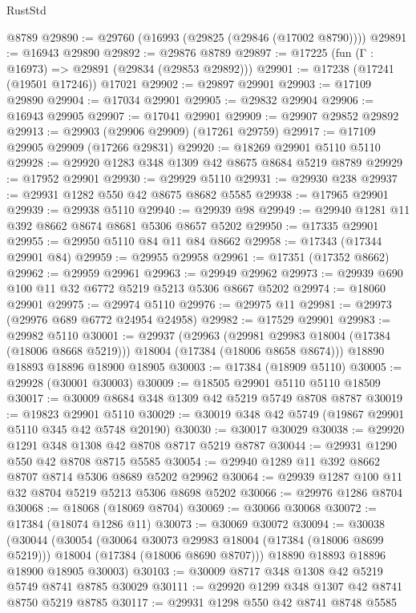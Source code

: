 \begin{lexlean}{RustStd}
\begin{coremodule}
    @8789
@29890 := @29760 (@16993 (@29825 (@29846 (@17002 @8790))))
@29891 := @16943 @29890
@29892 := @29876 @8789
@29897 := @17225 (fun (Γ : @16973) => @29891 (@29834 (@29853 @29892)))
@29901 := @17238 (@17241 (@19501 @17246)) @17021
@29902 := @29897 @29901
@29903 := @17109 @29890
@29904 := @17034 @29901
@29905 := @29832 @29904
@29906 := @16943 @29905
@29907 := @17041 @29901
@29909 := @29907 @29852 @29892
@29913 := @29903 (@29906 @29909) (@17261 @29759)
@29917 := @17109 @29905 @29909 (@17266 @29831)
@29920 := @18269 @29901 @5110 @5110
@29928 := @29920 @1283 @348 @1309 @42 @8675 @8684 @5219 @8789
@29929 := @17952 @29901
@29930 := @29929 @5110
@29931 := @29930 @238
@29937 := @29931 @1282 @550 @42 @8675 @8682 @5585
@29938 := @17965 @29901
@29939 := @29938 @5110
@29940 := @29939 @98
@29949 := @29940 @1281 @11 @392 @8662 @8674 @8681 @5306 @8657 @5202
@29950 := @17335 @29901
@29955 := @29950 @5110 @84 @11 @84 @8662
@29958 := @17343 (@17344 @29901 @84)
@29959 := @29955 @29958
@29961 := @17351 (@17352 @8662)
@29962 := @29959 @29961
@29963 := @29949 @29962
@29973 := @29939 @690 @100 @11 @32 @6772 @5219 @5213 @5306 @8667 @5202
@29974 := @18060 @29901
@29975 := @29974 @5110
@29976 := @29975 @11
@29981 := @29973 (@29976 @689 @6772 @24954 @24958)
@29982 := @17529 @29901
@29983 := @29982 @5110
@30001 := @29937
    (@29963
      (@29981 @29983 @18004 (@17384 (@18006 @8668 @5219)))
      @18004
      (@17384 (@18006 @8658 @8674)))
    @18890
    @18893
    @18896
    @18900
    @18905
@30003 := @17384 (@18909 @5110)
@30005 := @29928 (@30001 @30003)
@30009 := @18505 @29901 @5110 @5110 @18509
@30017 := @30009 @8684 @348 @1309 @42 @5219 @5749 @8708 @8787
@30019 := @19823 @29901 @5110
@30029 := @30019 @348 @42 @5749 (@19867 @29901 @5110 @345 @42 @5748 @20190)
@30030 := @30017 @30029
@30038 := @29920 @1291 @348 @1308 @42 @8708 @8717 @5219 @8787
@30044 := @29931 @1290 @550 @42 @8708 @8715 @5585
@30054 := @29940 @1289 @11 @392 @8662 @8707 @8714 @5306 @8689 @5202 @29962
@30064 := @29939 @1287 @100 @11 @32 @8704 @5219 @5213 @5306 @8698 @5202
@30066 := @29976 @1286 @8704
@30068 := @18068 (@18069 @8704)
@30069 := @30066 @30068
@30072 := @17384 (@18074 @1286 @11)
@30073 := @30069 @30072
@30094 := @30038
    (@30044
      (@30054
        (@30064 @30073 @29983 @18004 (@17384 (@18006 @8699 @5219)))
        @18004
        (@17384 (@18006 @8690 @8707)))
      @18890
      @18893
      @18896
      @18900
      @18905
      @30003)
@30103 := @30009 @8717 @348 @1308 @42 @5219 @5749 @8741 @8785 @30029
@30111 := @29920 @1299 @348 @1307 @42 @8741 @8750 @5219 @8785
@30117 := @29931 @1298 @550 @42 @8741 @8748 @5585

\end{coremodule}
\end{lexlean}
